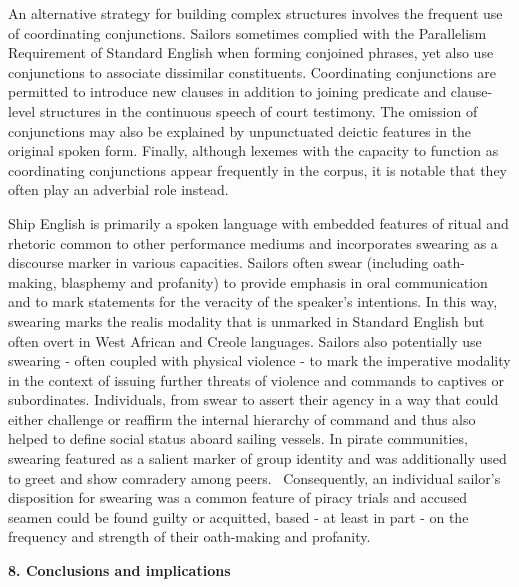 \begin{styleStandard}
An alternative strategy for building complex structures involves the frequent use of coordinating conjunctions. Sailors sometimes complied with the Parallelism Requirement of Standard English when forming conjoined phrases, yet also use conjunctions to associate dissimilar constituents. Coordinating conjunctions are permitted to introduce new clauses in addition to joining predicate and clause-level structures in the continuous speech of court testimony. The omission of conjunctions may also be explained by unpunctuated deictic features in the original spoken form. Finally, although lexemes with the capacity to function as coordinating conjunctions appear frequently in the corpus, it is notable that they often play an adverbial role instead. 
\end{styleStandard}

\begin{styleStandard}
Ship English is primarily a spoken language with embedded features of ritual and rhetoric common to other performance mediums and incorporates swearing as a discourse marker in various capacities. Sailors often swear (including oath-making, blasphemy and profanity) to provide emphasis in oral communication and to mark statements for the veracity of the speaker’s intentions. In this way, swearing marks the realis modality that is unmarked in Standard English but often overt in West African and Creole languages. Sailors also potentially use swearing - often coupled with physical violence - to mark the imperative modality in the context of issuing further threats of violence and commands to captives or subordinates. Individuals, from swear to assert their agency in a way that could either challenge or reaffirm the internal hierarchy of command and thus also helped to define social status aboard sailing vessels. In pirate communities, swearing featured as a salient marker of group identity and was additionally used to greet and show comradery among peers. \ Consequently, an individual sailor’s disposition for swearing was a common feature of piracy trials and accused seamen could be found guilty or acquitted, based - at least in part - on the frequency and strength of their oath-making and profanity. 
\end{styleStandard}

\clearpage\begin{styleStandard}
\textbf{8. Conclusions and implications}
\end{styleStandard}

